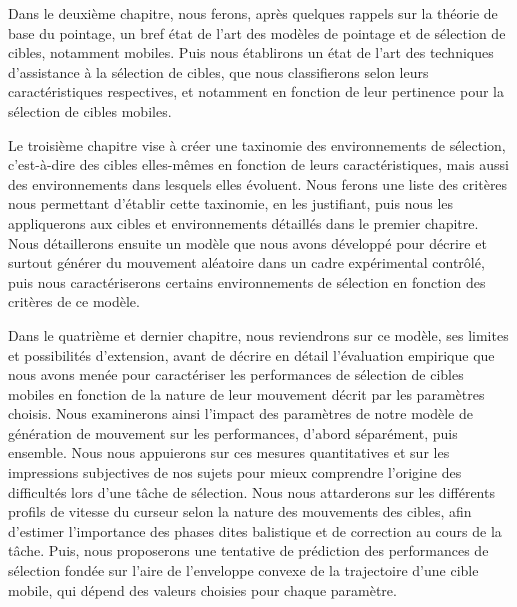 	Dans le deuxième chapitre, nous ferons, après quelques rappels sur la théorie de base du pointage, un bref état de l'art des modèles de pointage et de sélection de cibles, notamment mobiles. Puis nous établirons un état de l'art des techniques d'assistance à la sélection de cibles, que nous classifierons selon leurs caractéristiques respectives, et notamment en fonction de leur pertinence pour la sélection de cibles mobiles.
	
	Le troisième chapitre vise à créer une taxinomie des environnements de sélection, c'est-à-dire des cibles elles-mêmes en fonction de leurs caractéristiques, mais aussi des environnements dans lesquels elles évoluent. Nous ferons une liste des critères nous permettant d'établir cette taxinomie, en les justifiant, puis nous les appliquerons aux cibles et environnements détaillés dans le premier chapitre. Nous détaillerons ensuite un modèle que nous avons développé pour décrire et surtout générer du mouvement aléatoire dans un cadre expérimental contrôlé, puis nous caractériserons certains environnements de sélection en fonction des critères de ce modèle.
	
	Dans le quatrième et dernier chapitre, nous reviendrons sur ce modèle, ses limites et possibilités d'extension, avant de décrire en détail l'évaluation empirique que nous avons menée pour caractériser les performances de sélection de cibles mobiles en fonction de la nature de leur mouvement décrit par les paramètres choisis. Nous examinerons ainsi l'impact des paramètres de notre modèle de génération de mouvement sur les performances, d'abord séparément, puis ensemble. Nous nous appuierons sur ces mesures quantitatives et sur les impressions subjectives de nos sujets pour mieux comprendre l'origine des difficultés lors d'une tâche de sélection. Nous nous attarderons sur les différents profils de vitesse du curseur selon la nature des mouvements des cibles, afin d'estimer l'importance des phases dites balistique et de correction au cours de la tâche. Puis, nous proposerons une tentative de prédiction des performances de sélection fondée sur l'aire de l'enveloppe convexe de la trajectoire d'une cible mobile, qui dépend des valeurs choisies pour chaque paramètre.